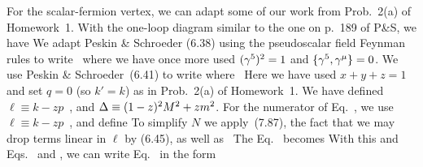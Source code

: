 \documentclass[11pt]{article}
\begin{document}
{	
	
	For the scalar-fermion vertex, we can adapt some of our work from Prob.~2(a) of Homework~1.  With the one-loop diagram similar to the one on p.~189 of P\&S, we have
	We adapt Peskin \& Schroeder (6.38) using the pseudoscalar field Feynman rules to write~\cite[p.~123]{Peskin}
	where we have once more used $(\gamma^5)^2 = 1$ and $\{ \gamma^5, \gamma^\mu \} = 0$.  We use Peskin \& Schroeder~(6.41) to write 
	where~\cite[pp.~190--191]{Peskin}
	Here we have used $x + y + z = 1$ and set $q = 0$ (so $k' = k$) as in Prob.~2(a) of Homework~1.  We have defined $\ell \equiv k - z p$~\cite[p.~191]{Peskin}, and $\Delta \equiv (1 - z)^2 M^2 + z m^2$.  For the numerator of Eq.~, we use $\ell \equiv k - z p$~\cite[p.~191]{Peskin}, and define
	To simplify $N$ we apply~(7.87),
	the fact that we may drop terms linear in $\ell$ by (6.45),
	as well as~\cite[pp.~191--192]{Peskin}
	The Eq.~ becomes
	With this and Eqs.~ and , we can write Eq.~ in the form
}
\end{document}
